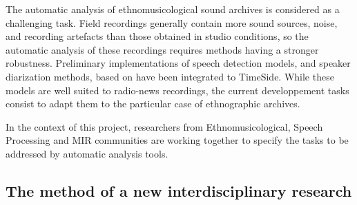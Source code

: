 \documentclass{sig-alternate}
\begin{document}
The automatic analysis of ethnomusicological sound archives is considered as a challenging task.
Field recordings generally contain more sound sources, noise, and recording artefacts than those obtained in studio conditions, so the automatic analysis of these recordings requires methods having a stronger robustness.
Preliminary implementations  of speech detection models, and speaker diarization methods, based on  \cite{barras2006multistage} have been integrated to TimeSide. 
While these models are well suited to radio-news recordings, the current developpement tasks consist to adapt them to the particular case of ethnographic archives.

In the context of this project, researchers from Ethnomusicological, Speech Processing and MIR communities are working together to specify the tasks to be addressed by automatic analysis tools.


\subsection{The method of a new interdisciplinary research}
\end{document}
